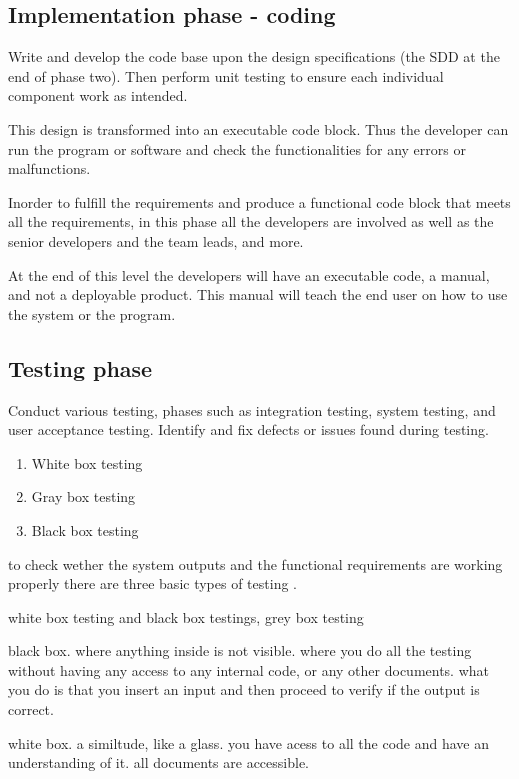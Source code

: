 \documentclass[a4paper]{article}
\begin{document}
\subsection{Implementation phase - coding}
 
Write and develop the code base upon the design specifications (the SDD at the end of phase two). Then perform unit testing to ensure each individual 
component work as intended. 
 
This design is transformed into an executable code block. Thus the developer can run the program or software and check the functionalities for any
errors or malfunctions.

Inorder to fulfill the requirements and produce a functional code block that meets all the requirements, in this phase all the developers are involved
as well as the senior developers and the team leads, and more.

At the end of this level the developers will have an executable code, a manual, and not a deployable product.  
This manual will teach the end user on how to use the system or the program. 


\subsection{Testing phase}

Conduct various testing, phases such as integration testing, system testing, and user acceptance testing. Identify and fix defects or issues found 
during testing.
\begin{enumerate}
    \item White box testing
    \item Gray box testing 
    \item Black box testing
\end{enumerate}
to check wether the system outputs and the functional requirements are working properly
there are three basic types of testing .

white box testing and black box testings, grey box testing 

black box. where anything inside is not visible. where you do all the testing without having any access to any internal code, or any other documents.
what you do is that you insert an input and then proceed to verify if the output is correct.



white box. a similtude, like a glass. you have acess to all the code and have an understanding of it. all documents are accessible.
\end{document}
